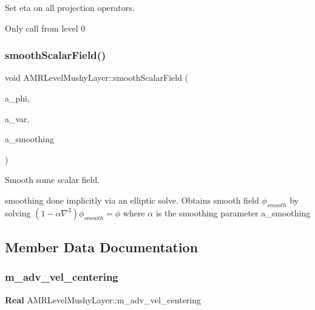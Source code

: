 Set eta on all projection operators. 

Only call from level 0 \mbox{\label{class_a_m_r_level_mushy_layer_aea3d5cfb654cc0e1e0f14bea830add39}} 
\subsubsection{\texorpdfstring{smooth\+Scalar\+Field()}{smoothScalarField()}}
{\footnotesize\ttfamily void A\+M\+R\+Level\+Mushy\+Layer\+::smooth\+Scalar\+Field (\begin{DoxyParamCaption}\item[{\textbf{ Level\+Data}$<$ \textbf{ F\+Array\+Box} $>$ \&}]{a\+\_\+phi,  }\item[{int}]{a\+\_\+var,  }\item[{\textbf{ Real}}]{a\+\_\+smoothing }\end{DoxyParamCaption})}



Smooth some scalar field. 

smoothing done implicitly via an elliptic solve. Obtains smooth field $\phi_{smooth}$ by solving $ (1-\alpha \nabla^2)\phi_{smooth} = \phi $ where $\alpha$ is the smoothing parameter a\+\_\+smoothing 

\subsection{Member Data Documentation}
\mbox{\label{class_a_m_r_level_mushy_layer_af41eb6058681e1345ce40633dd9fde1f}} 
\subsubsection{\texorpdfstring{m\+\_\+adv\+\_\+vel\+\_\+centering}{m\_adv\_vel\_centering}}
{\footnotesize\ttfamily \textbf{ Real} A\+M\+R\+Level\+Mushy\+Layer\+::m\+\_\+adv\+\_\+vel\+\_\+centering\hspace{0.3cm}{\ttfamily [protected]}}



